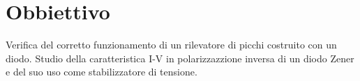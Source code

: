 \section*{Obbiettivo}

Verifica del corretto funzionamento di un rilevatore di picchi costruito con un diodo. Studio della caratteristica I-V in polarizzazzione inversa di un diodo Zener e del suo uso come stabilizzatore di tensione.
